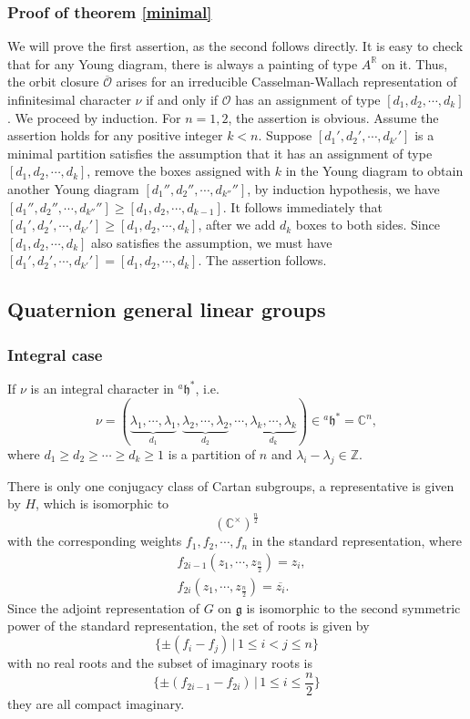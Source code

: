 \documentclass[12pt, a4paper]{amsart}
\numberwithin{equation}{section}
\newcommand{\BC}{{\mathbb {C}}}
\newcommand{\BR}{{\mathbb {R}}}
\newcommand{\BZ}{{\mathbb {Z}}}
\newcommand{\CO}{{\mathcal {O}}}
\newcommand{\fg}{\mathfrak{g}}
\newcommand{\fh}{\mathfrak{h}}
\newcommand{\set}[2]{\{#1\,|\,#2\}}
\renewcommand{\bar}{\overline}
\begin{document}
\subsubsection{Proof of theorem \ref{minimal}}


We will prove the first assertion, as the second follows directly. It is easy to check that for any Young diagram, there is always a painting of type $A^{\BR}$ on it. Thus, the orbit closure $\bar{\CO}$  arises for an irreducible Casselman-Wallach representation of infinitesimal character $\nu$ if and only if $\CO$ has an assignment of type $[d_1, d_2, \cdots, d_k]$. We proceed by induction. For $n = 1,2$, the assertion is obvious. Assume the assertion holds for any positive integer $k < n$. Suppose $[d_1', d_2', \cdots, d_{k'}']$ is a minimal partition satisfies the assumption that it has an assignment of type $[d_1, d_2, \cdots, d_k]$, remove the boxes assigned with $k$ in the Young diagram to obtain another Young diagram $[d_1'', d_2'', \cdots, d_{k''}'']$, by induction hypothesis, we have $[d_1'', d_2'', \cdots, d_{k''}''] \geq [d_1, d_2, \cdots, d_{k-1}]$. It follows immediately that $[d_1', d_2', \cdots , d_{k'}'] \geq [d_1, d_2, \cdots , d_k]$, after we add $d_k$ boxes to both sides. Since $[d_1, d_2, \cdots , d_k]$ also satisfies the assumption, we must have $[d_1', d_2', \cdots , d_{k'}'] = [d_1, d_2, \cdots , d_k]$. The assertion follows.






\subsection{Quaternion general linear groups}
\subsubsection{Integral case}
If $\nu$ is an integral character in $^{a}\fh^*$, i.e. 
$$\nu =  (\underbrace{\lambda_1, \cdots, \lambda_1}_{d_1}, \underbrace{\lambda_2, \cdots, \lambda_2}_{d_2}, \cdots, \underbrace{\lambda_k, \cdots, \lambda_k}_{d_k} ) \in {^{a}\fh^*} = \BC^n,$$ 
where $d_1 \geq d_2 \geq \cdots \geq d_k \geq 1$ is a partition of $n$ and $\lambda_i - \lambda_j \in \BZ$. 

There is only one conjugacy class of Cartan subgroups, a representative is given by $H$, which is isomorphic to
$$(\BC^\times)^{\frac{n}{2}}$$
with the corresponding weights $f_1, f_2, \cdots ,f_n$ in the standard representation, where
\begin{align}
    &f_{2i-1}(z_1,\cdots,z_{\frac{n}{2}}) = z_i,\\
    &f_{2i}(z_1,\cdots,z_{\frac{n}{2}}) = \bar{z_i}.
\end{align}
Since the adjoint representation of $G$ on $\fg$ is isomorphic to the second symmetric power of the standard representation, the set of roots is given by
$$\set{\pm(f_i - f_j)}{1\leq i < j \leq n}$$
with no real roots and the subset of imaginary roots is
$$\set{\pm(f_{2i-1}-f_{2i})}{1 \leq i \leq \frac{n}{2}}$$
they are all compact imaginary. 
\end{document}
